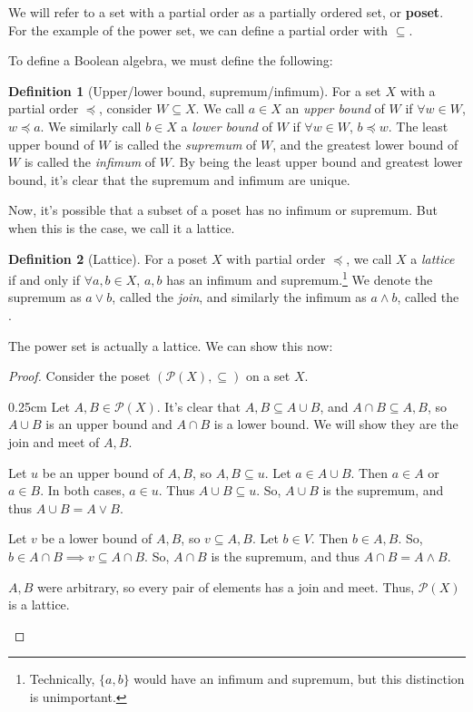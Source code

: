 \documentclass[10pt, letterpaper]{article}
\newcommand{\set}[1]{\{#1\}}
\newcommand{\powerset}[1]{\mathcal{P}(#1)}
\newenvironment{tabOver}[1]
{\begin{adjustwidth}{#1cm}{}}{\end{adjustwidth}}
\theoremstyle{definition}
\newtheorem{definition}{Definition}[section]
\begin{document}
We will refer to a set with a partial order as a partially ordered set, or \textbf{poset}.
For the example of the power set, we can define a partial order with \(\subseteq\).

To define a Boolean algebra, we must define the following:
\begin{definition}[Upper/lower bound, supremum/infimum]
	For a set \(X\) with a partial order \(\preceq\), consider \(W\subseteq X\).
	We call \(a\in X\) an \textit{upper bound} of \(W\) if \(\forall w\in W\), \(w\preceq a\).
	We similarly call \(b\in X\) a 
	\textit{lower bound} of \(W\) if \(\forall w\in W\), \(b\preceq w\).
	The least upper bound of \(W\) is called the \textit{supremum} of \(W\),
	and the greatest lower bound of \(W\) is called the \textit{infimum} of \(W\).
	By being the least upper bound and greatest lower bound, it's clear that
	the supremum and infimum are unique.
\end{definition}

Now, it's possible that a subset of a poset has no infimum or supremum.
But when this is the case, we call it a lattice.

\begin{definition}[Lattice]\label{def_lattice}
	For a poset \(X\) with partial order \(\preceq\), we call \(X\) a \textit{lattice}
	if and only if \(\forall a,b\in X\), \(a,b\) has an infimum and supremum.\footnote{
		Technically, \(\set{a,b}\) would have an infimum and supremum,
		but this distinction is unimportant.}
	We denote the supremum as \(a\vee b\), called the \textit{join},
	and similarly the infimum as \(a\wedge b\), called the .
\end{definition}

The power set is actually a lattice. We can show this now:
\begin{proof}
	Consider the poset \((\powerset{X}, \subseteq)\) on a set \(X\).
	\begin{tabOver}{0.25}
	Let \(A,B\in\powerset{X}\). It's clear that \(A, B\subseteq A\cup B\),
	and \(A\cap B\subseteq A,B\), so \(A\cup B\) is an upper bound and
	\(A\cap B\) is a lower bound. We will show they are the join and meet of \(A,B\).

	Let \(u\) be an upper bound of \(A,B\), so \(A,B\subseteq u\). Let \(a\in A\cup B\).
	Then \(a\in A\) or \(a\in B\). In both cases, \(a\in u\). Thus \(A\cup B\subseteq u\).
	So, \(A\cup B\) is the supremum, and thus \(A\cup B = A\vee B\).

	Let \(v\) be a lower bound of \(A,B\), so \(v\subseteq A,B\). Let \(b\in V\).
	Then \(b\in A, B\). So, \(b\in A\cap B\implies v\subseteq A\cap B\).
	So, \(A\cap B\) is the supremum, and thus \(A\cap B = A\wedge B\).

	\(A,B\) were arbitrary, so every pair of elements has a join and meet. 
	Thus, \(\powerset{X}\) is a lattice.
	\end{tabOver}
\end{proof}
\end{document}
